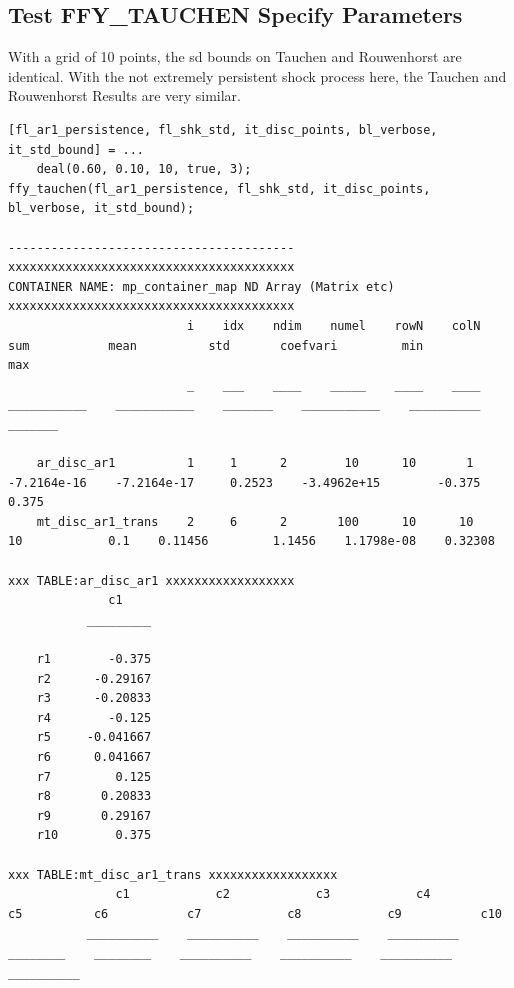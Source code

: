 \documentclass[
]{book}
\begin{document}
\hypertarget{test-ffy_tauchen-specify-parameters}{%
\subsection{Test FFY\_TAUCHEN Specify Parameters}\label{test-ffy_tauchen-specify-parameters}}

With a grid of 10 points, the sd bounds on Tauchen and Rouwenhorst are
identical. With the not extremely persistent shock process here, the
Tauchen and Rouwenhorst Results are very similar.

\begin{verbatim}
[fl_ar1_persistence, fl_shk_std, it_disc_points, bl_verbose, it_std_bound] = ...
    deal(0.60, 0.10, 10, true, 3);
ffy_tauchen(fl_ar1_persistence, fl_shk_std, it_disc_points, bl_verbose, it_std_bound);

----------------------------------------
xxxxxxxxxxxxxxxxxxxxxxxxxxxxxxxxxxxxxxxx
CONTAINER NAME: mp_container_map ND Array (Matrix etc)
xxxxxxxxxxxxxxxxxxxxxxxxxxxxxxxxxxxxxxxx
                         i    idx    ndim    numel    rowN    colN        sum           mean          std       coefvari         min          max  
                         _    ___    ____    _____    ____    ____    ___________    ___________    _______    ___________    __________    _______

    ar_disc_ar1          1     1      2        10      10       1     -7.2164e-16    -7.2164e-17     0.2523    -3.4962e+15        -0.375      0.375
    mt_disc_ar1_trans    2     6      2       100      10      10              10            0.1    0.11456         1.1456    1.1798e-08    0.32308

xxx TABLE:ar_disc_ar1 xxxxxxxxxxxxxxxxxx
              c1    
           _________

    r1        -0.375
    r2      -0.29167
    r3      -0.20833
    r4        -0.125
    r5     -0.041667
    r6      0.041667
    r7         0.125
    r8       0.20833
    r9       0.29167
    r10        0.375

xxx TABLE:mt_disc_ar1_trans xxxxxxxxxxxxxxxxxx
               c1            c2            c3            c4           c5          c6           c7            c8            c9           c10    
           __________    __________    __________    __________    ________    ________    __________    __________    __________    __________


\end{verbatim}
\end{document}
